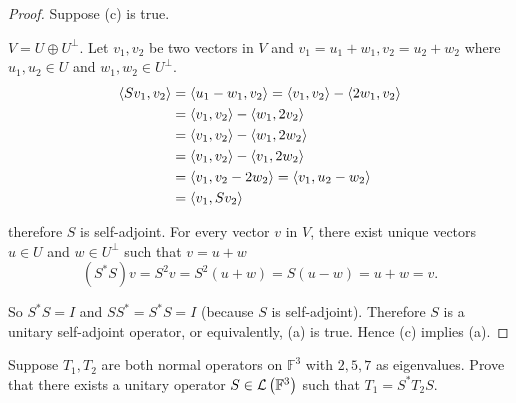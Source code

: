 \begin{proof}
    Suppose (c) is true.

    $V = U\oplus U^{\bot}$. Let $v_{1}, v_{2}$ be two vectors in $V$ and $v_{1} = u_{1} + w_{1}, v_{2} = u_{2} + w_{2}$ where $u_{1}, u_{2}\in U$ and $w_{1}, w_{2}\in U^{\bot}$.
    \begin{align*}
        \left\langle{Sv_{1}, v_{2}}\right\rangle & = \left\langle{u_{1} - w_{1}, v_{2}}\right\rangle = \left\langle{v_{1}, v_{2}}\right\rangle - \left\langle{2w_{1}, v_{2}}\right\rangle \\
                                  & = \left\langle{v_{1}, v_{2}}\right\rangle - \left\langle{w_{1}, 2v_{2}}\right\rangle                                    \\
                                  & = \left\langle{v_{1}, v_{2}}\right\rangle - \left\langle{w_{1}, 2w_{2}}\right\rangle                                    \\
                                  & = \left\langle{v_{1}, v_{2}}\right\rangle - \left\langle{v_{1}, 2w_{2}}\right\rangle                                    \\
                                  & = \left\langle{v_{1}, v_{2} - 2w_{2}}\right\rangle = \left\langle{v_{1}, u_{2} - w_{2}}\right\rangle                    \\
                                  & = \left\langle{v_{1}, Sv_{2}}\right\rangle
    \end{align*}

    therefore $S$ is self-adjoint. For every vector $v$ in $V$, there exist unique vectors $u\in U$ and $w\in U^{\bot}$ such that $v = u + w$
    \[
        (S^{*}S)v = S^{2}v = S^{2}(u + w) = S(u - w) = u + w = v.
    \]

    So $S^{*}S = I$ and $SS^{*} = S^{*}S = I$ (because $S$ is self-adjoint). Therefore $S$ is a unitary self-adjoint operator, or equivalently, (a) is true. Hence (c) implies (a).
\end{proof}
\newpage

\begin{exercise}
    Suppose $T_{1}, T_{2}$ are both normal operators on $\mathbb{F}^{3}$ with $2, 5, 7$ as eigenvalues. Prove that there exists a unitary operator $S \in \mathcal{L}\left({\mathbb{F}^{3}}\right)$ such that $T_{1} = S^{*} T_{2} S$.
\end{exercise}

